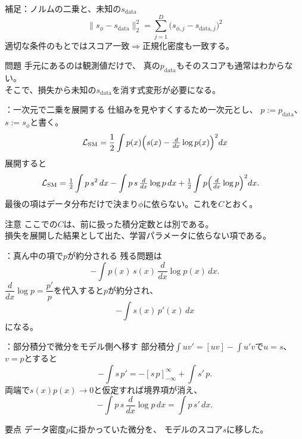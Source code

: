 \assuppl
\begin{frame}{補足：ノルムの二乗と、未知の$s_{\mathrm{data}}$}
    \[
        \|s_\phi-s_{\mathrm{data}}\|_2^2
        =
        \sum_{j=1}^{D}
        \bigl(s_{\phi,j}-s_{\mathrm{data},j}\bigr)^2
    \]
    適切な条件のもとではスコア一致$\Rightarrow$正規化密度も一致する。
    \begin{exampleblock}{問題}
        手元にあるのは観測値だけで、
        真の$p_{\mathrm{data}}$もそのスコアも通常はわからない。\\
        そこで、損失から未知の$s_{\mathrm{data}}$を消す式変形が必要になる。
    \end{exampleblock}
\end{frame}
\assuppl
\begin{frame}{\supplmark：一次元で二乗を展開する}
    仕組みを見やすくするため一次元とし、
    $p:=p_{\mathrm{data}}$、$s:=s_\phi$と書く。
    \[
        \mathcal{L}_{\mathrm{SM}}
        =
        \frac12\int p(x)\Bigl(s(x)-\tfrac{d}{dx}\log p(x)\Bigr)^2dx
    \]
    展開すると
    \begin{align*}
        \mathcal{L}_{\mathrm{SM}}
        &=
        \tfrac12\int p\,s^2\,dx
        -\int p\,s\,\tfrac{d}{dx}\log p\,dx
        +\tfrac12\int p\Bigl(\tfrac{d}{dx}\log p\Bigr)^2dx.
    \end{align*}
    最後の項はデータ分布だけで決まり$\phi$に依らない。これを$C$とおく。
    \begin{exampleblock}{注意}
        ここでの$C$は、前に扱った積分定数とは別である。\\
        損失を展開した結果として出た、学習パラメータに依らない項である。
    \end{exampleblock}
\end{frame}
\assuppl
\begin{frame}{\supplmark：真ん中の項で$p$が約分される}
    残る問題は
    \[
        -\int p(x)\,s(x)\,\frac{d}{dx}\log p(x)\,dx.
    \]
    $\dfrac{d}{dx}\log p=\dfrac{p'}{p}$を代入すると$p$が約分され、
    \[
        -\int s(x)\,p'(x)\,dx
    \]
    になる。
\end{frame}
\assuppl
\begin{frame}{\supplmark：部分積分で微分をモデル側へ移す}
    部分積分$\int u v'=[uv]-\int u'v$で$u=s$、$v=p$とすると
    \[
        -\int s\,p'
        =
        -[s\,p]_{-\infty}^{\infty}
        +\int s'\,p.
    \]
    両端で$s(x)p(x)\to0$と仮定すれば境界項が消え、
    \[
        -\int p\,s\,\frac{d}{dx}\log p\,dx
        =
        \int p\,s'\,dx.
    \]
    \begin{exampleblock}{要点}
        データ密度$p$に掛かっていた微分を、
        モデルのスコア$s$に移した。
    \end{exampleblock}
\end{frame}
